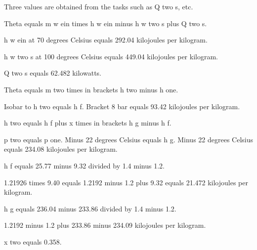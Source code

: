 Three values are obtained from the tasks such as Q two s, etc.

Theta equals m w ein times h w ein minus h w two s plus Q two s.

h w ein at 70 degrees Celsius equals 292.04 kilojoules per kilogram.

h w two s at 100 degrees Celsius equals 449.04 kilojoules per kilogram.

Q two s equals 62.482 kilowatts.

Theta equals m two times in brackets h two minus h one.

Isobar to h two equals h f. Bracket 8 bar equals 93.42 kilojoules per kilogram.

h two equals h f plus x times in brackets h g minus h f.

p two equals p one. Minus 22 degrees Celsius equals h g. Minus 22 degrees Celsius equals 234.08 kilojoules per kilogram.

h f equals 25.77 minus 9.32 divided by 1.4 minus 1.2.

1.21926 times 9.40 equals 1.2192 minus 1.2 plus 9.32 equals 21.472 kilojoules per kilogram.

h g equals 236.04 minus 233.86 divided by 1.4 minus 1.2.

1.2192 minus 1.2 plus 233.86 minus 234.09 kilojoules per kilogram.

x two equals 0.358.
